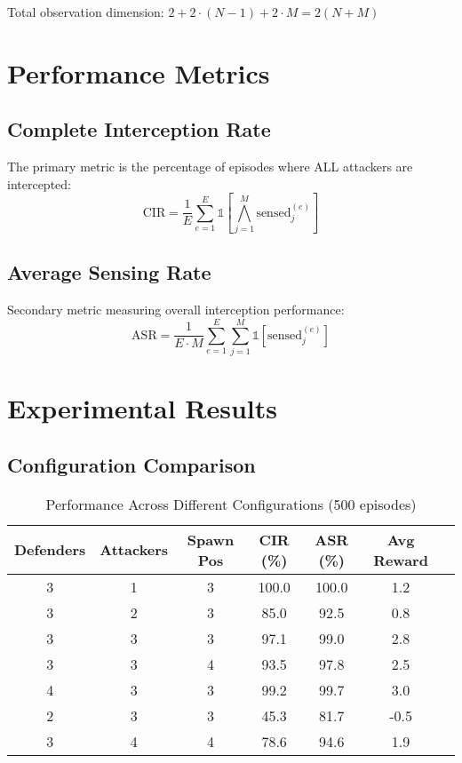 \documentclass[11pt,a4paper]{article}
\begin{document}
Total observation dimension: $2 + 2 \cdot (N-1) + 2 \cdot M = 2(N + M)$

\section{Performance Metrics}

\subsection{Complete Interception Rate}

The primary metric is the percentage of episodes where ALL attackers are intercepted:
\begin{equation}
    \text{CIR} = \frac{1}{E} \sum_{e=1}^{E} \mathbb{1}\left[\bigwedge_{j=1}^{M} \text{sensed}_j^{(e)}\right]
\end{equation}

\subsection{Average Sensing Rate}

Secondary metric measuring overall interception performance:
\begin{equation}
    \text{ASR} = \frac{1}{E \cdot M} \sum_{e=1}^{E} \sum_{j=1}^{M} \mathbb{1}[\text{sensed}_j^{(e)}]
\end{equation}

\section{Experimental Results}

\subsection{Configuration Comparison}

\begin{table}[h]
\centering
\caption{Performance Across Different Configurations (500 episodes)}
\begin{tabular}{ccccccc}
\toprule
\textbf{Defenders} & \textbf{Attackers} & \textbf{Spawn Pos} & \textbf{CIR (\%)} & \textbf{ASR (\%)} & \textbf{Avg Reward} \\
\midrule
3 & 1 & 3 & 100.0 & 100.0 & 1.2 \\
3 & 2 & 3 & 85.0 & 92.5 & 0.8 \\
3 & 3 & 3 & 97.1 & 99.0 & 2.8 \\
3 & 3 & 4 & 93.5 & 97.8 & 2.5 \\
4 & 3 & 3 & 99.2 & 99.7 & 3.0 \\
2 & 3 & 3 & 45.3 & 81.7 & -0.5 \\
3 & 4 & 4 & 78.6 & 94.6 & 1.9 \\
\bottomrule
\end{tabular}
\end{table}
\end{document}
